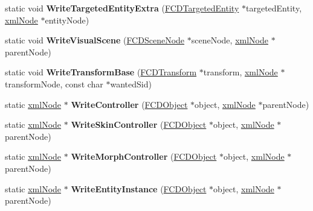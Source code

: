 \begin{DoxyCompactItemize}
\item 
\hypertarget{classFArchiveXML_ad4b2d4193b9e44f8b922310d831eb04c}{
static void {\bfseries WriteTargetedEntityExtra} (\hyperlink{classFCDTargetedEntity}{FCDTargetedEntity} $\ast$targetedEntity, \hyperlink{struct__xmlNode}{xmlNode} $\ast$entityNode)}
\label{classFArchiveXML_ad4b2d4193b9e44f8b922310d831eb04c}

\item 
\hypertarget{classFArchiveXML_a3dd267983d86203d3ff1877a22320d3f}{
static void {\bfseries WriteVisualScene} (\hyperlink{classFCDSceneNode}{FCDSceneNode} $\ast$sceneNode, \hyperlink{struct__xmlNode}{xmlNode} $\ast$parentNode)}
\label{classFArchiveXML_a3dd267983d86203d3ff1877a22320d3f}

\item 
\hypertarget{classFArchiveXML_a8359af935af1f842a275061ce869ff38}{
static void {\bfseries WriteTransformBase} (\hyperlink{classFCDTransform}{FCDTransform} $\ast$transform, \hyperlink{struct__xmlNode}{xmlNode} $\ast$transformNode, const char $\ast$wantedSid)}
\label{classFArchiveXML_a8359af935af1f842a275061ce869ff38}

\item 
\hypertarget{classFArchiveXML_aae6c98a03591fd28aec379fa0946a230}{
static \hyperlink{struct__xmlNode}{xmlNode} $\ast$ {\bfseries WriteController} (\hyperlink{classFCDObject}{FCDObject} $\ast$object, \hyperlink{struct__xmlNode}{xmlNode} $\ast$parentNode)}
\label{classFArchiveXML_aae6c98a03591fd28aec379fa0946a230}

\item 
\hypertarget{classFArchiveXML_a0554213a4ab113f7a7b8fa0e1d376bfd}{
static \hyperlink{struct__xmlNode}{xmlNode} $\ast$ {\bfseries WriteSkinController} (\hyperlink{classFCDObject}{FCDObject} $\ast$object, \hyperlink{struct__xmlNode}{xmlNode} $\ast$parentNode)}
\label{classFArchiveXML_a0554213a4ab113f7a7b8fa0e1d376bfd}

\item 
\hypertarget{classFArchiveXML_abfc73128f77a8248c441a941eaebba2d}{
static \hyperlink{struct__xmlNode}{xmlNode} $\ast$ {\bfseries WriteMorphController} (\hyperlink{classFCDObject}{FCDObject} $\ast$object, \hyperlink{struct__xmlNode}{xmlNode} $\ast$parentNode)}
\label{classFArchiveXML_abfc73128f77a8248c441a941eaebba2d}

\item 
\hypertarget{classFArchiveXML_af7fc27ff38234f8237b658620e1ff6e8}{
static \hyperlink{struct__xmlNode}{xmlNode} $\ast$ {\bfseries WriteEntityInstance} (\hyperlink{classFCDObject}{FCDObject} $\ast$object, \hyperlink{struct__xmlNode}{xmlNode} $\ast$parentNode)}
\label{classFArchiveXML_af7fc27ff38234f8237b658620e1ff6e8}


\end{DoxyCompactItemize}
